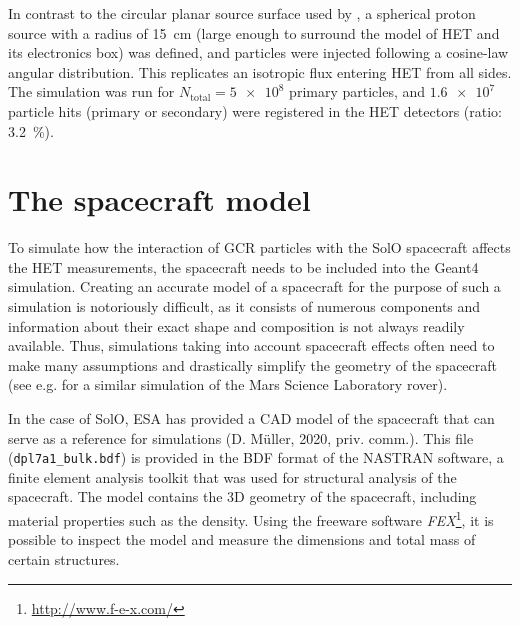 In contrast to the circular planar source surface used by \citet{Elftmann-2020-PhD}, a spherical proton source with a radius of \SI{15}{\centi\meter} (large enough to surround the model of \ac{HET} and its electronics box) was defined, and particles were injected following a cosine-law angular distribution. This replicates an isotropic flux entering \ac{HET} from all sides.
The simulation was run for $N_\text{total} = \num{5e8}$ primary particles, and $\num{1.6e7}$ particle hits (primary or secondary) were registered in the \ac{HET} detectors (ratio: \SI{3.2}{\percent}).

\section{The spacecraft model}
\label{sec:spacecraft_model}

To simulate how the interaction of \ac{GCR} particles with the \ac{SolO} spacecraft affects the \ac{HET} measurements, the spacecraft needs to be included into the \ac{Geant4} simulation. Creating an accurate model of a spacecraft for the purpose of such a simulation is notoriously difficult, as it consists of numerous components and information about their exact shape and composition is not always readily available. Thus, simulations taking into account spacecraft effects often need to make many assumptions and drastically simplify the geometry of the spacecraft (see e.g. \citet{Appel-2018-PhD,Appel-2018} for a similar simulation of the Mars Science Laboratory rover).

In the case of \ac{SolO}, ESA has provided a \ac{CAD} model of the spacecraft that can serve as a reference for simulations (D. Müller, 2020, priv. comm.). This file (\texttt{dpl7a1\_bulk.bdf}) is provided in the BDF format of the NASTRAN software, a finite element analysis toolkit that was used for structural analysis of the spacecraft. The model contains the 3D geometry of the spacecraft, including material properties such as the density. Using the freeware software \textit{FEX}\footnote{\url{http://www.f-e-x.com/}}, it is possible to inspect the model and measure the dimensions and total mass of certain structures.

